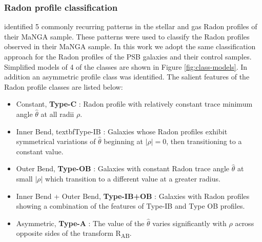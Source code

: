 \subsubsection{Radon profile classification}


\cite{2018MNRAS.480.2217S} identified 5 commonly recurring patterns in the stellar and gas Radon profiles of their MaNGA sample. These patterns were used to classify the Radon profiles observed in their MaNGA sample. In this work we adopt the same classification approach for the Radon profiles of the PSB galaxies and their control samples. Simplified models of 4 of the classes are shown in Figure \ref{fig:class-models}. In addition an asymmetric profile class was identified. The salient features of the Radon profile classes are listed below:

\begin{itemize}
    \item Constant, \textbf{Type-C} : Radon profile with relatively constant trace minimum angle $\hat{\theta}$ at all radii $\rho$.
    \item Inner Bend, textbf{Type-IB} : Galaxies whose Radon profiles exhibit symmetrical variations of $\hat{\theta}$ beginning at $|\rho|=0$, then transitioning to a constant value. 
    \item Outer Bend, \textbf{Type-OB} : Galaxies with constant Radon trace angle $\hat{\theta}$  at small $|\rho|$ which transition to a different value at a greater radius. 
    \item Inner Bend + Outer Bend, \textbf{Type-IB+OB} : Galaxies with Radon profiles showing a combination of the features of Type-IB and Type OB profiles.
    \item Asymmetric, \textbf{Type-A} : The value of the $\hat{\theta}$ varies significantly with $\rho$ across opposite sides of the transform R\textsubscript{AB}. 
 \end{itemize}

